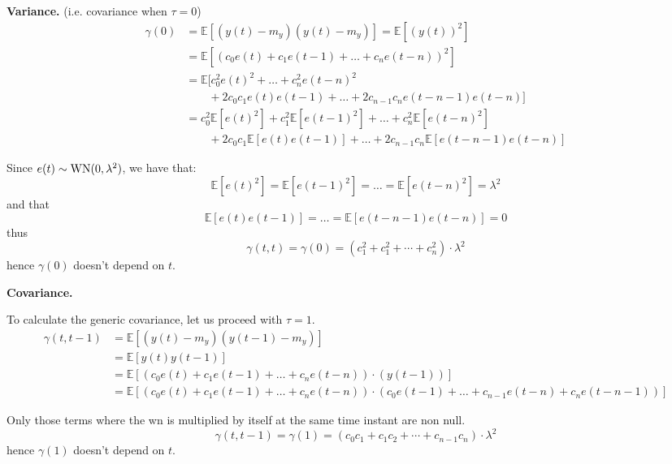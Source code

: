 \textbf{Variance.} (i.e. covariance when $\tau =0$)
\begin{align*}
	\gamma (0)&=\mathbb{E}[(y(t)-m_{y})(y(t)-m_{y})]=\mathbb{E}[(y(t))^2]\\
	&=\mathbb{E}[(c_{0} e(t)+c_{1} e(t-1)+\ldots+c_{n} e(t-n))^{2}]\\
	&=\mathbb{E}[c_{0}^{2} e(t)^{2}+\ldots+c_{n}^{2} e(t-n)^{2}\\
	&\qquad+2 c_{0} c_{1} e(t) e(t-1)+\ldots+2 c_{n-1} c_{n} e(t-n-1) e(t-n)]\\
	&=c_{0}^{2} \mathbb{E}[e(t)^{2}]+c_{1}^{2} \mathbb{E}[e(t-1)^{2}]+\ldots+c_{n}^{2} \mathbb{E}[e(t-n)^{2}]\\
	&\qquad+2 c_{0} c_{1} \mathbb{E}[e(t) e(t-1)]+\ldots+2 c_{n-1} c_{n} \mathbb{E}[e(t-n-1) e(t-n)]
\end{align*}

Since $e(t) \sim \operatorname{WN}(0, \lambda^{2})$, we have that:
$$
\mathbb{E}[e(t)^{2}]=\mathbb{E}[e(t-1)^{2}]=\ldots=\mathbb{E}[e(t-n)^{2}]=\lambda^{2}
$$
and that
$$
\mathbb{E}[e(t) e(t-1)]=\ldots=\mathbb{E}[e(t-n-1) e(t-n)]=0
$$
thus
\[
	\boxed{\gamma (t,t)=\gamma (0)=(c_{1}^2 +c_{1}^2 +\cdots+c_{n}^2 )\cdot\lambda^2}
\]
hence $\gamma (0)$ doesn't depend on $t$.

\textbf{Covariance.}

To calculate the generic covariance, let us proceed with $\tau =1$.
\begin{align*}
	\gamma(t, t-1)&=\mathbb{E}[(y(t)-m_{y})(y(t-1)-m_{y})]\\
	&=\mathbb{E}[y(t) y(t-1)]\\
	&=\mathbb{E}[(c_{0} e(t)+c_{1} e(t-1)+\ldots+c_{n} e(t-n))\cdot (y(t-1))]\\
	&=\mathbb{E}[(c_{0} e(t)+c_{1} e(t-1)+\ldots+c_{n} e(t-n))\cdot (c_{0} e(t-1)+\ldots+c_{n-1} e(t-n)+c_{n} e(t-n-1))]
\end{align*}

Only those terms where the \gls{wn} is multiplied by itself at the same time instant are non null.
\[
	\gamma(t, t-1)=\gamma (1)=(c_{0}c_{1}+c_{1}c_{2}+\cdots+c_{n-1}c_{n})\cdot\lambda^2
\]
hence $\gamma (1)$ doesn't depend on $t$.

